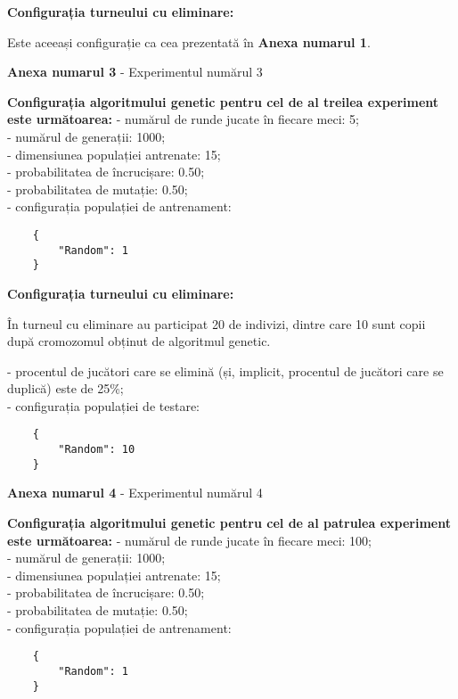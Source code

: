 \textbf{Configurația turneului cu eliminare: }

Este aceeași configurație ca cea prezentată în \textbf{Anexa numarul 1}.

\clearpage

\begin{center}
	\textbf{Anexa numarul 3} - Experimentul numărul 3
\end{center}

\textbf{Configurația algoritmului genetic pentru cel de al treilea experiment este următoarea: }
- numărul de runde jucate în fiecare meci: 5;\\
- numărul de generații: 1000;\\
- dimensiunea populației antrenate: 15;\\
- probabilitatea de încrucișare: 0.50;\\
- probabilitatea de mutație: 0.50;\\
- configurația populației de antrenament:\\
\begin{center}
	\begin{lstlisting}
	{
		"Random": 1
	}
	\end{lstlisting}
\end{center}

\textbf{Configurația turneului cu eliminare: }

În turneul cu eliminare au participat 20 de indivizi, dintre care 10 sunt copii după cromozomul obținut de algoritmul genetic. 

- procentul de jucători care se elimină (și, implicit, procentul de jucători care se duplică) este de 25\%;\\
- configurația populației de testare:\\
\begin{center}
	\begin{lstlisting}
	{
		"Random": 10
	}
	\end{lstlisting}
\end{center}

\clearpage

\begin{center}
	\textbf{Anexa numarul 4} - Experimentul numărul 4
\end{center}

\textbf{Configurația algoritmului genetic pentru cel de al patrulea experiment este următoarea: }
- numărul de runde jucate în fiecare meci: 100;\\
- numărul de generații: 1000;\\
- dimensiunea populației antrenate: 15;\\
- probabilitatea de încrucișare: 0.50;\\
- probabilitatea de mutație: 0.50;\\
- configurația populației de antrenament:\\
\begin{center}
	\begin{lstlisting}
	{
		"Random": 1
	}
	\end{lstlisting}
\end{center}

